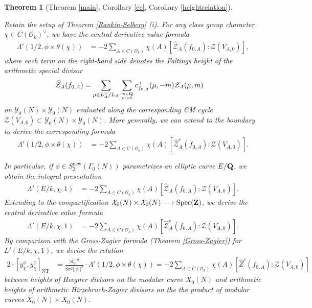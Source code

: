 \documentclass{amsart}
\newtheorem{theorem}{Theorem}[section]
\theoremstyle{definition}
\theoremstyle{definition}
\theoremstyle{definition}
\begin{document}
\begin{theorem}[Theorem \ref{main}, Corollary \ref{ec}, Corollary \ref{heightrelation}]\label{GZ-AHZ} 

Retain the setup of Theorem \ref{Rankin-Selberg} (i).
For any class group character $\chi \in C(\mathcal{O}_k)^{\vee}$, we have the central derivative value formula 
\begin{align*} \Lambda'(1/2, \phi \times \theta(\chi)) &= - 2 \sum\limits_{A \in C(\mathcal{O}_k)} \chi(A) 
\left[ \widehat{\mathcal{Z}}_A(f_{0, A}): \mathcal{Z}(V_{A,0})\right],\end{align*}
where each term on the right-hand side denotes the Faltings height of the arithmetic special divisor 
\begin{align*} \widehat{\mathcal{Z}}_A(f_{0, A}) 
&= \sum\limits_{\mu \in L_A^{\vee}/L_A} \sum\limits_{m \in {\bf{Q}} \atop m > 0} c_{f_{0, A}}^+(\mu, -m) \mathcal{Z}_A(\mu, m) \end{align*} 
on $\mathcal{Y}_0(N) \times \mathcal{Y}_0(N)$ evaluated along the corresponding CM cycle $\mathcal{Z}(V_{A,0}) \subset \mathcal{Y}_0(N) \times \mathcal{Y}_0(N)$. 
More generally, we can extend to the boundary to derive the corresponding formula 
\begin{align*} \Lambda'(1/2, \phi \times \theta(\chi)) &= - 2 \sum\limits_{A \in C(\mathcal{O}_k)} \chi(A) 
\left[ \widehat{\mathcal{Z}}_A^c(f_{0, A}): \mathcal{Z}(V_{A,0})\right]. \end{align*}

In particular, if $\phi \in S_2^{\operatorname{new}}(\Gamma_0(N))$ parametrizes an elliptic curve $E/{\bf{Q}}$, we obtain the integral presentation
\begin{align*} \Lambda'(E/k, \chi, 1) &= - 2 \sum\limits_{A \in C(\mathcal{O}_k)} \chi(A) 
\left[ \widehat{\mathcal{Z}}_A(f_{0, A}): \mathcal{Z}(V_{A,0})\right]. \end{align*}
Extending to the compactification $\mathcal{X}_0(N) \times \mathcal{X}_0(N) \longrightarrow \operatorname{Spec}({\bf{Z}})$, we derive the central derivative value formula
\begin{align*} \Lambda'(E/k, \chi, 1) &= - 2 \sum\limits_{A \in C(\mathcal{O}_k)} \chi(A) 
\left[ \widehat{\mathcal{Z}}_A^c(f_{0, A}): \mathcal{Z}(V_{A,0})\right]. \end{align*} %
By comparison with the Gross-Zagier formula (Theorem \ref{Gross-Zagier}) for $L'(E/k, \chi, 1)$, we derive the relation  
\begin{align*} 2 \cdot \left[ y_{\chi}^{\phi}, y_{\chi}^{\phi} \right]_{\operatorname{NT}} 
&= \frac{\vert d_k \vert^{\frac{1}{2}}}{ 8 \pi^2 \vert \vert \phi \vert \vert^2 } \cdot \Lambda'(1/2, \phi \times \theta(\chi))
= -  2 \sum\limits_{A \in C(\mathcal{O}_k)} \chi(A) \left[ \widehat{Z}^c(f_{0, A}) : \mathcal{Z}(V_{A,0}) \right] \end{align*}
between heights of Heegner divisors on the modular curve $X_0(N)$ and arithmetic heights of arithmetic Hirzebruch-Zagier
divisors on the the product of modular curves $X_0(N) \times X_0(N)$. \end{theorem}
\end{document}
